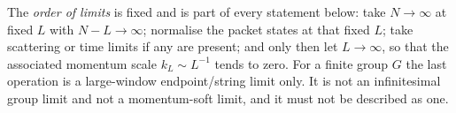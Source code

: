 \begin{definition}
The \emph{order of limits} is fixed and is part of every statement below:
take $N\to\infty$ at fixed $L$ with $N-L\to\infty$; normalise the packet
states at that fixed $L$; take scattering or time limits if any are present;
and only then let $L\to\infty$, so that the associated momentum scale
$k_L\sim L^{-1}$ tends to zero. For a finite group $G$ the last operation is a
large-window endpoint/string limit only. It is not an infinitesimal group
limit and not a momentum-soft limit, and it must not be described as one.
\end{definition}


